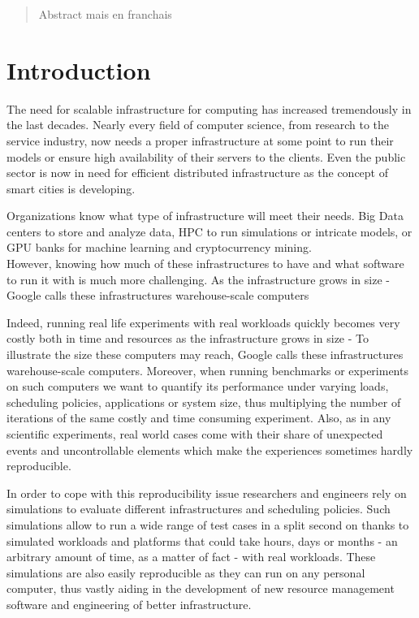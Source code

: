 \documentclass[12pt, a4paper]{memoir}
\begin{document}
\renewcommand\abstractname{R\'esum\'e}
\begin{abstract} 
	Abstract mais en franchais
\end{abstract}

\tableofcontents* %
\normalsize

\mainmatter
\SingleSpace

\chapter{Introduction}


The need for scalable infrastructure for computing has increased tremendously
in the last decades.  Nearly every field of computer science, from research to
the service industry, now needs a proper infrastructure at some point to run
their models or ensure high availability of their servers to the clients. Even
the public sector is now in need for efficient distributed infrastructure as
the concept of smart cities is developing.

Organizations know what type of infrastructure will meet their needs. Big Data
centers to store and analyze data, HPC to run simulations or intricate models,
or GPU banks for machine learning and cryptocurrency mining.\\

However, knowing how much of these infrastructures to have and what software to
run it with is much more challenging. As the infrastructure grows in size -
Google calls these infrastructures warehouse-scale
computers\cite{barroso2018datacenter}

Indeed, running real life
experiments with real workloads quickly becomes very costly both in time and
resources as the infrastructure grows in size - To illustrate the size these
computers may reach, Google calls these infrastructures warehouse-scale
computers\cite{barroso2018datacenter}.  Moreover, when running benchmarks or
experiments on such computers we want to quantify its performance under varying
loads, scheduling policies, applications or system size, thus multiplying the
number of iterations of the same costly and time consuming experiment.  Also,
as in any scientific experiments, real world cases come with their share of
unexpected events and uncontrollable elements which make the experiences
sometimes hardly reproducible.

In order to cope with this reproducibility issue researchers and engineers rely
on simulations to evaluate different infrastructures and scheduling policies.
Such simulations allow to run a wide range of test cases in a split second on
thanks to simulated workloads and platforms that could take hours, days or
months - an arbitrary amount of time, as a matter of fact - with real
workloads. These simulations are also easily reproducible as they can run on
any personal computer, thus vastly aiding in the development of new resource
management software and engineering of better infrastructure.
\end{document}
